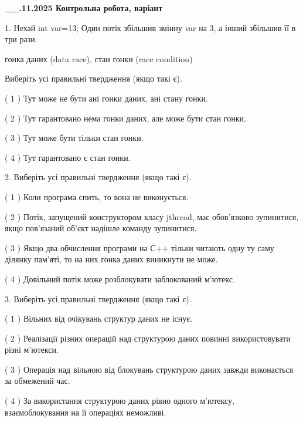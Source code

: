 \documentclass[12pt, ukrainian]{article}
\begin{document}
\newpage
\begin {large}

\textbf{\_\_.11.2025 Контрольна робота, варіант  }\par


{
1. Нехай int var=13; Один потік збільшив змінну var на 3, а інший збільшив її в три рази.

гонка даних (data race), стан гонки (race condition)

Виберіть усі правильні твердження (якщо такі є).\par
\vspace{2mm}
( 1 ) Тут може не бути ані гонки даних, ані стану гонки.%

( 2 ) Тут гарантовано нема гонки даних, але може бути стан гонки.%

( 3 ) Тут може бути тільки стан гонки.%

( 4 ) Тут гарантовано є стан гонки.%


2. Виберіть усі правильні твердження (якщо такі є).\par
\vspace{2mm}

( 1 ) Коли програма спить, то вона не виконується.%

( 2 ) Потік, запущений конструктором класу jthread, має обов’язково зупинитися, якщо пов’язаний об’єкт надішле команду зупинитися.%

( 3 ) Якщо два обчислення програми на С++ тільки читають одну ту саму ділянку пам'яті, то на них гонка даних  виникнути не може.%

( 4 ) Довільний потік може розблокувати заблокований м’ютекс.%


3. Виберіть усі правильні твердження (якщо такі є).\par
\vspace{2mm}

( 1 ) Вільних від очікувань структур даних не існує.%

( 2 ) Реалізації різних операцій над структурою даних повинні використовувати різні м’ютекси.%

( 3 ) Операція над вільною від блокувань структурою даних завжди виконається за обмежений час.%

( 4 ) За використання структурою даних рівно одного м’ютексу, взаємоблокування на її операціях неможливі.%


}
\end{large}
\end{document}
